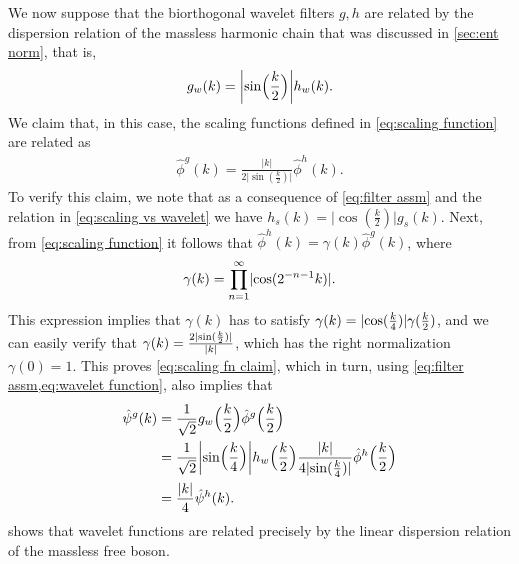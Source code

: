 \documentclass[submission, Phys]{SciPost}
\theoremstyle{definition}
\theoremstyle{remark}
\DeclarePairedDelimiter{\abs}{\lvert}{\rvert}
\newcommand{\change}[1]{#1}
\begin{document}
\change{We now suppose that the biorthogonal wavelet filters $g,h$ are related by the dispersion relation of the massless harmonic chain that was discussed in \cref{sec:ent norm}, that is,
\begin{align}\label{eq:filter assm}
  g_w(k) = \abs*{\sin\Bigl(\frac{k}{2}\Bigr)} h_w(k).
\end{align}
We claim that, in this case, the scaling functions defined in \cref{eq:scaling function} are related as
\begin{align}\label{eq:scaling fn claim}
  \hat{\phi}^g(k) = \frac{\lvert k \rvert}{2 \lvert \sin(\frac{k}{2})\rvert} \hat{\phi}^h(k).
\end{align}
To verify this claim, we note that as a consequence of \cref{eq:filter assm} and the relation in \cref{eq:scaling vs wavelet} we have $h_s(k) = \lvert\cos(\frac{k}{2})\rvert g_s(k)$.
Next, from \cref{eq:scaling function} it follows that $\hat{\phi}^h(k) = \gamma(k) \hat{\phi}^g(k)$, where
\begin{align*}
  \gamma(k) = \prod_{n=1}^{\infty} \abs{\cos(2^{-n-1}k)}.
\end{align*}
This expression implies that $\gamma(k)$ has to satisfy $\gamma(k) = \abs{\cos(\frac{k}{4})}\gamma(\frac{k}{2})$, and we can easily verify that $\gamma(k) = \frac{2\abs{\sin(\frac{k}{2})}}{\abs{k}}$, which has the right normalization $\gamma(0) = 1$.
This proves \cref{eq:scaling fn claim}, which in turn, using \cref{eq:filter assm,eq:wavelet function}, also implies that
\begin{align}
\nonumber
  \hat{\psi}^g(k) &= \frac{1}{\sqrt2}g_w\Bigl(\frac{k}{2}\Bigr)\hat{\phi}^g\Bigl(\frac{k}{2}\Bigr)\\
\nonumber
  &= \frac{1}{\sqrt2}\abs*{\sin\Bigl(\frac{k}{4}\Bigr)}h_w\Bigl(\frac{k}{2}\Bigr)\frac{\lvert k \rvert}{4 \lvert \sin(\frac{k}{4})\rvert}\hat{\phi}^h\Bigl(\frac{k}{2}\Bigr)\\
\label{eq:dispersion yay}
  &= \frac{\lvert k \rvert}{4}\hat{\psi}^h(k).
\end{align}}%
 shows that wavelet functions are related precisely by the linear dispersion relation of the massless free boson.
\end{document}
